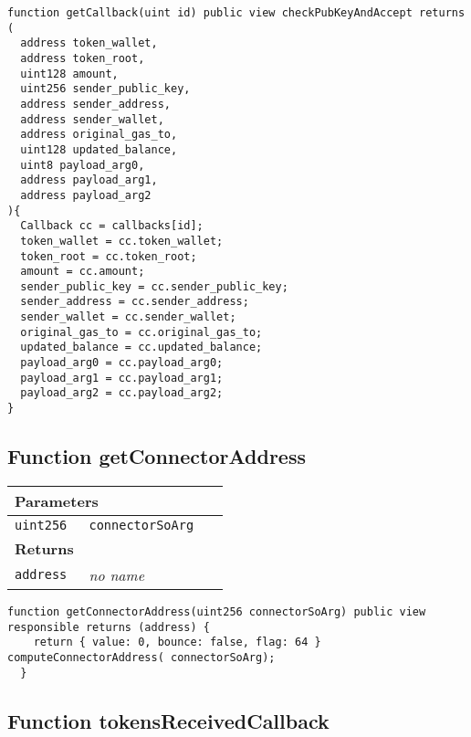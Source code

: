 \vspace{2cm}

\begin{lstlisting}[firstnumber=571]
function getCallback(uint id) public view checkPubKeyAndAccept returns (
  address token_wallet,
  address token_root,
  uint128 amount,
  uint256 sender_public_key,
  address sender_address,
  address sender_wallet,
  address original_gas_to,
  uint128 updated_balance,
  uint8 payload_arg0,
  address payload_arg1,
  address payload_arg2
){
  Callback cc = callbacks[id];
  token_wallet = cc.token_wallet;
  token_root = cc.token_root;
  amount = cc.amount;
  sender_public_key = cc.sender_public_key;
  sender_address = cc.sender_address;
  sender_wallet = cc.sender_wallet;
  original_gas_to = cc.original_gas_to;
  updated_balance = cc.updated_balance;
  payload_arg0 = cc.payload_arg0;
  payload_arg1 = cc.payload_arg1;
  payload_arg2 = cc.payload_arg2;
}
\end{lstlisting}

\subsection{Function getConnectorAddress}


\ifsoltables
\noindent\begin{tabular}{|l|l|p{5cm}|}\hline
\multicolumn{3}{|l|}{\bf Parameters}\\\hline
\tt uint256 & \tt connectorSoArg &\\\hline
\multicolumn{3}{|l|}{\bf Returns}\\\hline
\tt address & {\em no name} &\\\hline
\end{tabular}
\fi

\vspace{2cm}

\begin{lstlisting}[firstnumber=108]
  function getConnectorAddress(uint256 connectorSoArg) public view responsible returns (address) {
    return { value: 0, bounce: false, flag: 64 } computeConnectorAddress( connectorSoArg);
  }
\end{lstlisting}

\subsection{Function tokensReceivedCallback}



